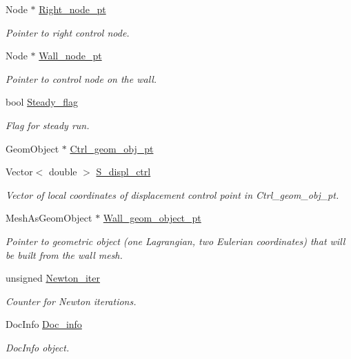 \begin{DoxyCompactItemize}
Node $\ast$ \hyperlink{classFSICollapsibleChannelProblem_a5ab75d4a593a35fb12d1e016ae3e41c4}{Right\+\_\+node\+\_\+pt}
\begin{DoxyCompactList}\small\item\em Pointer to right control node. \end{DoxyCompactList}\item 
Node $\ast$ \hyperlink{classFSICollapsibleChannelProblem_a377285ce93d55b9c6035737796da1bbf}{Wall\+\_\+node\+\_\+pt}
\begin{DoxyCompactList}\small\item\em Pointer to control node on the wall. \end{DoxyCompactList}\item 
bool \hyperlink{classFSICollapsibleChannelProblem_a7f21548c86e387a26a55062ef50ea416}{Steady\+\_\+flag}
\begin{DoxyCompactList}\small\item\em Flag for steady run. \end{DoxyCompactList}\item 
Geom\+Object $\ast$ \hyperlink{classFSICollapsibleChannelProblem_a0af9dba0fa399669d099b67b8c6906fa}{Ctrl\+\_\+geom\+\_\+obj\+\_\+pt}
\item 
Vector$<$ double $>$ \hyperlink{classFSICollapsibleChannelProblem_a203ee0ecb406f97e62b6e7facb8119b5}{S\+\_\+displ\+\_\+ctrl}
\begin{DoxyCompactList}\small\item\em Vector of local coordinates of displacement control point in Ctrl\+\_\+geom\+\_\+obj\+\_\+pt. \end{DoxyCompactList}\item 
Mesh\+As\+Geom\+Object $\ast$ \hyperlink{classFSICollapsibleChannelProblem_a1fc8d15ea0d359e0df8a677415b77dc3}{Wall\+\_\+geom\+\_\+object\+\_\+pt}
\begin{DoxyCompactList}\small\item\em Pointer to geometric object (one Lagrangian, two Eulerian coordinates) that will be built from the wall mesh. \end{DoxyCompactList}\item 
unsigned \hyperlink{classFSICollapsibleChannelProblem_a72b19fe66f2c9019ee2da6987a09995c}{Newton\+\_\+iter}
\begin{DoxyCompactList}\small\item\em Counter for Newton iterations. \end{DoxyCompactList}\item 
Doc\+Info \hyperlink{classFSICollapsibleChannelProblem_a31ea75b732e42eec45f333a26d6cb2ac}{Doc\+\_\+info}
\begin{DoxyCompactList}\small\item\em Doc\+Info object. \end{DoxyCompactList}\end{DoxyCompactItemize}


